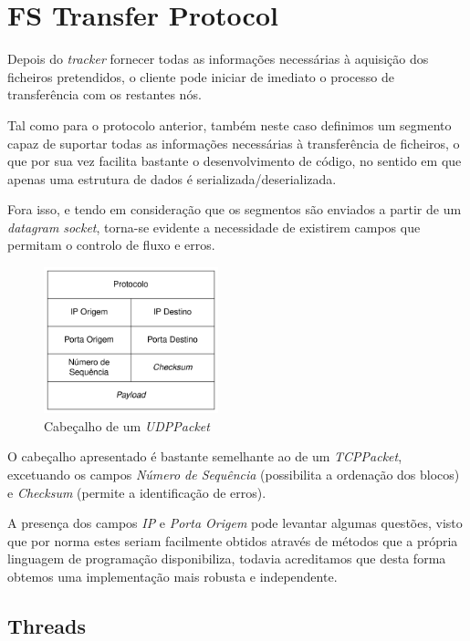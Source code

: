 \section{FS Transfer Protocol}

    Depois do \textit{tracker} fornecer todas as informações necessárias à aquisição dos ficheiros pretendidos, o cliente pode iniciar de imediato o processo de transferência com os restantes nós.

    Tal como para o protocolo anterior, também neste caso definimos um segmento capaz de suportar todas as informações necessárias à transferência de ficheiros, o que por sua vez facilita bastante o desenvolvimento de código, no sentido em que apenas uma estrutura de dados é serializada/deserializada.

    Fora isso, e tendo em consideração que os segmentos são enviados a partir de um \textit{datagram socket}, torna-se evidente a necessidade de existirem campos que permitam o controlo de fluxo e erros.

    \newpage
    \begin{figure}[hb!]
        \centering
        \includegraphics[width=0.45\textwidth]{Imagens/Headers/node.png}
        \caption{Cabeçalho de um \textit{UDPPacket}}
    \end{figure}

    O cabeçalho apresentado é bastante semelhante ao de um \textit{TCPPacket}, excetuando os campos \textit{Número de Sequência} (possibilita a ordenação dos blocos) e \textit{Checksum} (permite a identificação de erros).

    A presença dos campos \textit{IP} e \textit{Porta Origem} pode levantar algumas questões, visto que por norma estes seriam facilmente obtidos através de métodos que a própria linguagem de programação disponibiliza, todavia acreditamos que desta forma obtemos uma implementação mais robusta e independente.

    \subsection{Threads}

